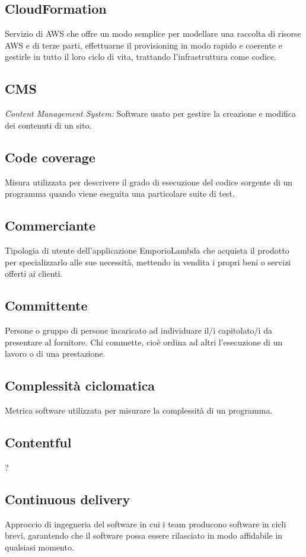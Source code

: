 \subsection*{CloudFormation}
Servizio di AWS che offre un modo semplice per modellare una raccolta di risorse AWS e di terze parti, effettuarne il provisioning in modo rapido e coerente e gestirle in tutto il loro ciclo di vita, trattando l'infrastruttura come codice.

\subsection*{CMS}
\textit{Content Management System:} Software usato per gestire la creazione e modifica dei contenuti di un sito.

\subsection*{Code coverage}
Misura utilizzata per descrivere il grado di esecuzione del codice sorgente di un programma quando viene eseguita una particolare suite di test.

\subsection*{Commerciante}
Tipologia di utente dell'applicazione EmporioLambda che acquista il prodotto per specializzarlo alle sue necessità, mettendo in vendita i propri beni o servizi offerti ai clienti.

\subsection*{Committente}
Persone o gruppo di persone incaricato ad individuare il/i capitolato/i da presentare al fornitore. Chi commette, cioè ordina ad altri l'esecuzione di un lavoro o di una prestazione.

\subsection*{Complessità ciclomatica}
Metrica software utilizzata per misurare la complessità di un programma.

\subsection*{Contentful}
?

\subsection*{Continuous delivery}
Approccio di ingegneria del software in cui i team producono software in cicli brevi, garantendo che il software possa essere rilasciato in modo affidabile in qualsiasi momento.

